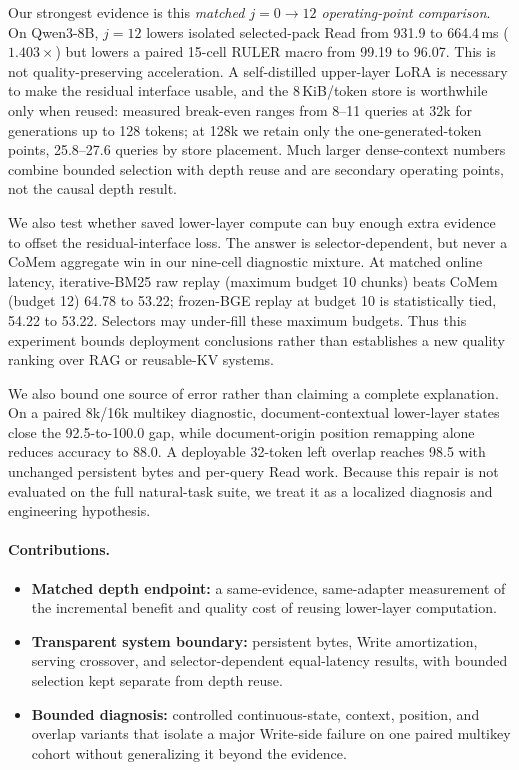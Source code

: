 Our strongest evidence is this \emph{matched $j{=}0\!\rightarrow\!12$
operating-point comparison}. On
Qwen3-8B, $j{=}12$ lowers isolated selected-pack Read from 931.9 to 664.4\,ms
($1.403\times$) but lowers a paired 15-cell RULER macro from 99.19 to 96.07.
This is not quality-preserving acceleration. A self-distilled upper-layer LoRA
is necessary to make the residual interface usable, and the 8\,KiB/token store
is worthwhile only when reused: measured break-even ranges from 8--11 queries
at 32k for generations up to 128 tokens; at 128k we retain only the
one-generated-token points, 25.8--27.6 queries by store placement. Much larger dense-context numbers combine bounded
selection with depth reuse and are secondary operating points, not the causal
depth result.

We also test whether saved lower-layer compute can buy enough extra evidence to
offset the residual-interface loss. The answer is selector-dependent, but never
a CoMem aggregate win in our nine-cell diagnostic mixture. At matched online
latency, iterative-BM25 raw replay (maximum budget 10 chunks) beats CoMem
(budget 12) 64.78 to 53.22; frozen-BGE replay at budget 10 is statistically
tied, 54.22 to 53.22. Selectors may under-fill these maximum budgets.
Thus this experiment bounds deployment conclusions rather than establishes a
new quality ranking over RAG or reusable-KV systems.

We also bound one source of error rather than claiming a complete explanation.
On a paired 8k/16k multikey diagnostic, document-contextual lower-layer states
close the 92.5-to-100.0 gap, while document-origin position remapping alone
reduces accuracy to 88.0. A deployable 32-token left overlap reaches 98.5 with
unchanged persistent bytes and per-query Read work. Because this repair is not
evaluated on the full natural-task suite, we treat it as a localized diagnosis
and engineering hypothesis.

\paragraph{Contributions.}
\begin{itemize}[leftmargin=1.2em,itemsep=1pt,topsep=2pt]
\item \textbf{Matched depth endpoint:} a same-evidence, same-adapter measurement of
the incremental benefit and quality cost of reusing lower-layer computation.
\item \textbf{Transparent system boundary:} persistent bytes, Write
amortization, serving crossover, and selector-dependent equal-latency results, with
bounded selection kept separate from depth reuse.
\item \textbf{Bounded diagnosis:} controlled continuous-state, context,
position, and overlap variants that isolate a major Write-side failure on one
paired multikey cohort without generalizing it beyond the evidence.
\end{itemize}
